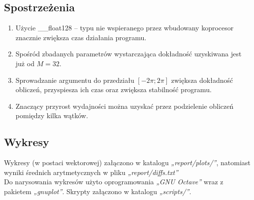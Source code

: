 \documentclass[12pt]{article}
\begin{document}
\subsection{Spostrzeżenia}
\begin{enumerate}
    \item Użycie \_\_float128 – typu nie wspieranego przez wbudowany koprocesor znacznie zwiększa czas działania programu.
    \item Spośród zbadanych parametrów wystarczająca dokładność uzyskiwana jest już od $M = 32$.
    \item Sprowadzanie argumentu do przedziału $[-2\pi;2\pi]$ zwiększa dokładność obliczeń, przyspiesza ich czas oraz zwiększa stabilność programu.
    \item Znaczący przyrost wydajności można uzyskać przez podzielenie obliczeń pomiędzy kilka wątków.
\end{enumerate}

\subsection{Wykresy}
Wykresy (w postaci wektorowej) załączono w katalogu \textit{„report/plots/”}, natomiast wyniki średnich arytmetycznych w pliku \textit{„report/diffs.txt”}\\
Do narysowania wykresów użyto oprogramowania \textit{„GNU Octave”} wraz z pakietem \textit{„gnuplot”}. Skrypty załączono w katalogu \textit{„scripts/”}.
\end{document}
